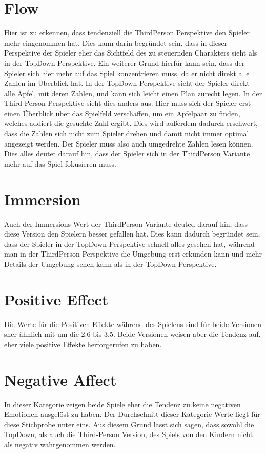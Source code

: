 \section{Flow}
\label{sec:flowDisk}
Hier ist zu erkennen, dass tendenziell die ThirdPerson Perspektive den Spieler mehr eingenommen hat. Dies kann darin begründet sein, dass in dieser Perspektive der Spieler eher das Sichtfeld des zu steuernden Charakters sieht als in der TopDown-Perspektive. Ein weiterer Grund hierfür kann sein, dass der Spieler sich hier mehr auf das Spiel konzentrieren muss, da er nicht direkt alle Zahlen im Überblick hat. In der TopDown-Perspektive sieht der Spieler direkt alle Äpfel, mit deren Zahlen, und kann sich leicht einen Plan zurecht legen. In der Third-Person-Perspektive sieht dies anders aus. Hier muss sich der Spieler erst einen Überblick über das Spielfeld verschaffen, um ein Apfelpaar zu finden, welches addiert die gesuchte Zahl ergibt. Dies wird außerdem dadurch erschwert, dass die Zahlen sich nicht zum Spieler drehen und damit nicht immer optimal angezeigt werden. Der Spieler muss also auch umgedrehte Zahlen lesen können. Dies alles deutet darauf hin, dass der Spieler sich in der ThirdPerson Variante mehr auf das Spiel fokusieren muss. 
\section{Immersion}
\label{sec:immersionDisk}
Auch der Immersions-Wert der ThirdPerson Variante deuted darauf hin, dass diese Version den Spielern besser gefallen hat. Dies kann dadurch begründet sein, dass der Spieler in der TopDown Perspektive schnell alles gesehen hat, während man in der ThirdPerson Perspektive die Umgebung erst erkunden kann und mehr Details der Umgebung sehen kann als in der TopDown Perspektive.
\section{Positive Effect} %
\label{sec:poseffDisk}
Die Werte für die Positiven Effekte während des Spielens sind für beide Versionen sher ähnlich mit um die 2.6 bis 3.5. Beide Versionen weisen aber die Tendenz auf, eher viele positive Effekte herforgerufen zu haben.
\section{Negative Affect}
\label{sec:negeffDisk}
In dieser Kategorie zeigen beide Spiele eher die Tendenz zu keine negativen Emotionen ausgelöst zu haben. Der Durchschnitt dieser Kategorie-Werte liegt für diese Stichprobe unter eins. Aus diesem Grund lässt sich sagen, dass sowohl die TopDown, als auch die Third-Person Version, des Spiels von den Kindern nicht als negativ wahrgenommen werden.
